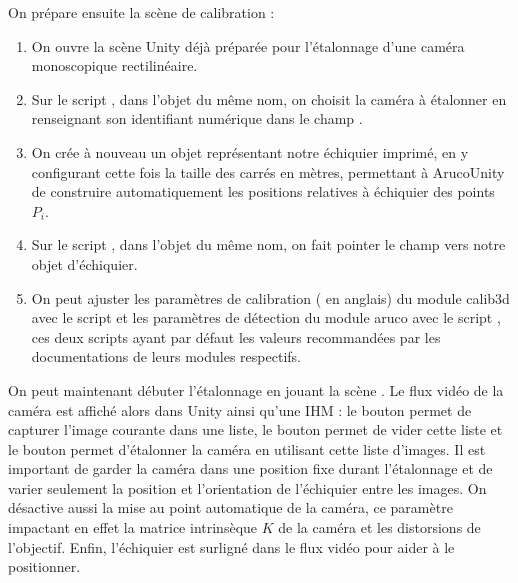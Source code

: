 
On prépare ensuite la scène de calibration :
\begin{enumerate}
  \item On ouvre la scène Unity  déjà préparée pour l'étalonnage d'une caméra monoscopique rectilinéaire.
  \item Sur le script , dans l'objet du même nom, on choisit la caméra à étalonner en renseignant son identifiant numérique dans le champ .
  \item On crée à nouveau un objet représentant notre échiquier imprimé, en y configurant cette fois la taille des carrés en mètres, permettant à ArucoUnity de construire automatiquement les positions relatives à échiquier des points $P_i$.
  \item Sur le script , dans l'objet du même nom, on fait pointer le champ  vers notre objet d'échiquier.
  \item On peut ajuster les paramètres de calibration ( en anglais) du module calib3d avec le script  et les paramètres de détection du module aruco avec le script , ces deux scripts ayant par défaut les valeurs recommandées par les documentations de leurs modules respectifs.
\end{enumerate}


On peut maintenant débuter l'étalonnage en jouant la scène . Le flux vidéo de la caméra est affiché alors dans Unity ainsi qu'une IHM : le bouton  permet de capturer l'image courante dans une liste, le bouton  permet de vider cette liste et le bouton  permet d'étalonner la caméra en utilisant cette liste d'images. Il est important de garder la caméra dans une position fixe durant l'étalonnage et de varier seulement la position et l'orientation de l'échiquier entre les images. On désactive aussi la mise au point automatique de la caméra, ce paramètre impactant en effet la matrice intrinsèque	$K$ de la caméra et les distorsions de l'objectif. Enfin, l'échiquier est surligné dans le flux vidéo pour aider à le positionner.


